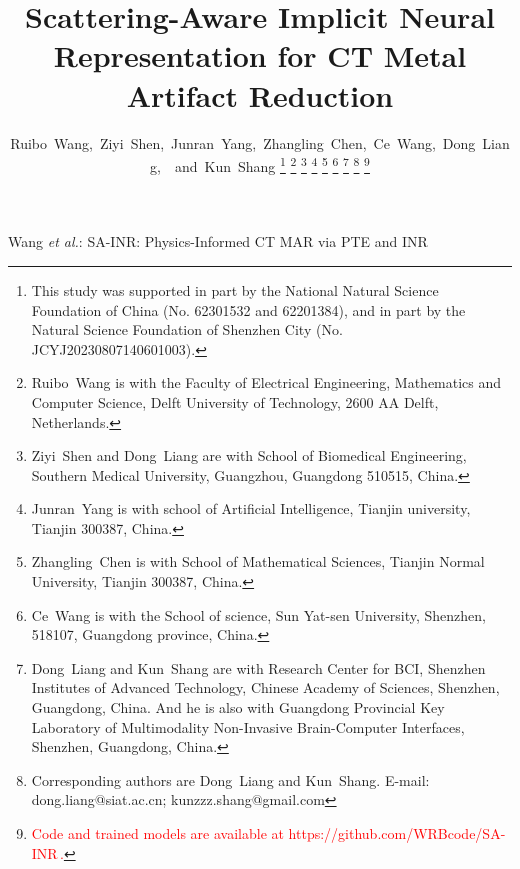 \documentclass[journal]{IEEEtran}
\newcommand{\new}[1]{\textcolor{red}{#1}}  %
\def\ourmodel{SA-INR}
\begin{document}
\title{Scattering-Aware Implicit Neural Representation for CT Metal Artifact Reduction}

\author{
Ruibo~Wang,~Ziyi~Shen,~Junran~Yang,~Zhangling~Chen,~Ce~Wang,~Dong~Liang,~~and~Kun~Shang
\thanks{This study was supported in part by the National Natural Science Foundation of China (No. 62301532 and 62201384), and in part by the Natural Science Foundation of Shenzhen City (No. JCYJ20230807140601003).}
\thanks{Ruibo~Wang is with the Faculty of Electrical Engineering, Mathematics and Computer Science, Delft University of Technology, 2600 AA Delft, Netherlands.}
\thanks{Ziyi~Shen and Dong~Liang are with School of Biomedical Engineering, Southern Medical University, Guangzhou, Guangdong 510515, China.}
\thanks{Junran~Yang is with school of Artificial Intelligence, Tianjin university, Tianjin 300387, China.}
\thanks{Zhangling~Chen is with School of Mathematical Sciences, Tianjin Normal University, Tianjin 300387, China.}
\thanks{Ce~Wang is with the School of science, Sun Yat-sen University, Shenzhen, 518107, Guangdong province, China.}
\thanks{Dong~Liang and Kun~Shang are with Research Center for BCI, Shenzhen Institutes of Advanced Technology, Chinese Academy of Sciences, Shenzhen, Guangdong, China. And he is also with Guangdong Provincial Key Laboratory of Multimodality Non-Invasive Brain-Computer Interfaces, Shenzhen, Guangdong, China.}
\thanks{Corresponding authors are Dong~Liang and Kun~Shang. E-mail: dong.liang@siat.ac.cn; kunzzz.shang@gmail.com}
\thanks{\new{Code and trained models are available at https://github.com/WRBcode/SA-INR\,.}}
}
{Wang \MakeLowercase{\textit{et al.}}: \ourmodel : Physics-Informed CT MAR via PTE and INR}
\maketitle
\end{document}
